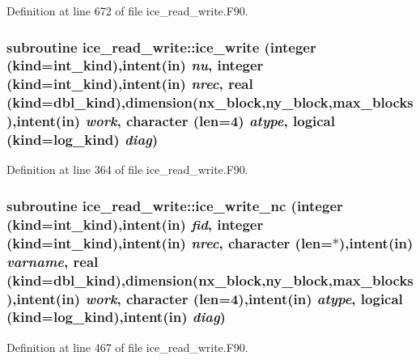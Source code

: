Definition at line 672 of file ice\_\-read\_\-write.F90.\hypertarget{namespaceice__read__write_a6fd5225cadcb9e4b36318dc93d4d8201}{
\subsubsection[{ice\_\-write}]{\setlength{\rightskip}{0pt plus 5cm}subroutine ice\_\-read\_\-write::ice\_\-write (integer (kind=int\_\-kind),intent(in) {\em nu}, \/  integer (kind=int\_\-kind),intent(in) {\em nrec}, \/  real (kind=dbl\_\-kind),dimension(nx\_\-block,ny\_\-block,max\_\-blocks),intent(in) {\em work}, \/  character (len=4) {\em atype}, \/  logical (kind=log\_\-kind) {\em diag})}}
\label{namespaceice__read__write_a6fd5225cadcb9e4b36318dc93d4d8201}


Definition at line 364 of file ice\_\-read\_\-write.F90.\hypertarget{namespaceice__read__write_a371e7c35fea2456c221e0451f87bb2eb}{
\subsubsection[{ice\_\-write\_\-nc}]{\setlength{\rightskip}{0pt plus 5cm}subroutine ice\_\-read\_\-write::ice\_\-write\_\-nc (integer (kind=int\_\-kind),intent(in) {\em fid}, \/  integer (kind=int\_\-kind),intent(in) {\em nrec}, \/  character (len=$\ast$),intent(in) {\em varname}, \/  real (kind=dbl\_\-kind),dimension(nx\_\-block,ny\_\-block,max\_\-blocks),intent(in) {\em work}, \/  character (len=4),intent(in) {\em atype}, \/  logical (kind=log\_\-kind),intent(in) {\em diag})}}
\label{namespaceice__read__write_a371e7c35fea2456c221e0451f87bb2eb}


Definition at line 467 of file ice\_\-read\_\-write.F90.